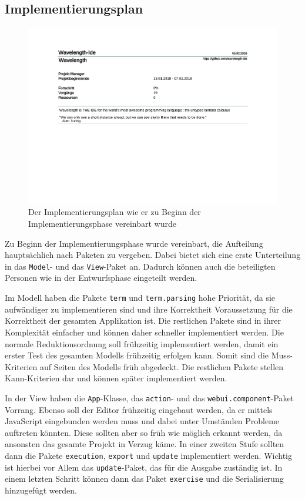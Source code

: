 \documentclass[parskip=full,11pt]{scrartcl}
\begin{document}
\begin{itemize}
\section{Implementierungsplan}
\begin{figure}[h]
\hspace*{-2cm}
\includegraphics[trim={0, 9.5cm, 0, 0}, clip, scale=0.65, page=4]{Implementierungsplan/Implementierungsplan-vorher.pdf}
\caption{Der Implementierungsplan wie er zu Beginn der Implementierungsphase vereinbart wurde}
\end{figure}

Zu Beginn der Implementierungsphase wurde vereinbart, die Aufteilung hauptsächlich nach Paketen zu vergeben.
Dabei bietet sich eine erste Unterteilung in das \texttt{Model}- und das \texttt{View}-Paket an.
Dadurch können auch die beteiligten Personen wie in der Entwurfsphase eingeteilt werden.

Im Modell haben die Pakete \texttt{term} und \texttt{term.parsing} hohe Priorität, da sie aufwändiger zu implementieren
sind und ihre Korrektheit Voraussetzung für die Korrektheit der gesamten Applikation ist.
Die restlichen Pakete sind in ihrer Komplexität einfacher und können daher schneller implementiert werden.
Die normale Reduktionsordnung soll frühzeitig implementiert werden, damit ein erster Test des gesamten Modells frühzeitig erfolgen kann.
Somit sind die Muss-Kriterien auf Seiten des Modells früh abgedeckt.
Die restlichen Pakete stellen Kann-Kriterien dar und können später implementiert werden.

In der View haben die \texttt{App}-Klasse, das \texttt{action}- und das \texttt{webui.component}-Paket Vorrang.
Ebenso soll der Editor frühzeitig eingebaut werden, da er mittels JavaScript eingebunden werden muss und dabei unter Umständen Probleme
auftreten könnten.
Diese sollten aber so früh wie möglich erkannt werden, da ansonsten das gesamte Projekt in Verzug käme.
In einer zweiten Stufe sollten dann die Pakete \texttt{execution}, \texttt{export} und \texttt{update} implementiert werden.
Wichtig ist hierbei vor Allem das \texttt{update}-Paket, das für die Ausgabe zuständig ist.
In einem letzten Schritt können dann das Paket \texttt{exercise} und die Serialisierung hinzugefügt werden.


\end{itemize}
\end{document}
